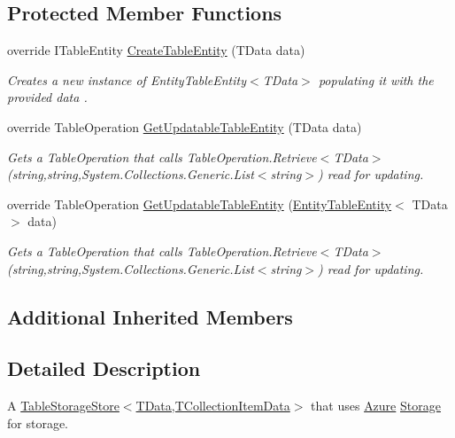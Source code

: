 \subsection*{Protected Member Functions}
\begin{DoxyCompactItemize}
\item 
override I\+Table\+Entity \hyperlink{classCqrs_1_1Azure_1_1BlobStorage_1_1DataStores_1_1TableStorageDataStore_ac28ce10858480acc61d3a3df4fb3dae4_ac28ce10858480acc61d3a3df4fb3dae4}{Create\+Table\+Entity} (T\+Data data)
\begin{DoxyCompactList}\small\item\em Creates a new instance of Entity\+Table\+Entity$<$\+T\+Data$>$ populating it with the provided {\itshape data} . \end{DoxyCompactList}\item 
override Table\+Operation \hyperlink{classCqrs_1_1Azure_1_1BlobStorage_1_1DataStores_1_1TableStorageDataStore_aa4dc1bfeeb55483b68d8af3414000f7a_aa4dc1bfeeb55483b68d8af3414000f7a}{Get\+Updatable\+Table\+Entity} (T\+Data data)
\begin{DoxyCompactList}\small\item\em Gets a Table\+Operation that calls Table\+Operation.\+Retrieve$<$\+T\+Data$>$(string,string,\+System.\+Collections.\+Generic.\+List$<$string$>$) read for updating. \end{DoxyCompactList}\item 
override Table\+Operation \hyperlink{classCqrs_1_1Azure_1_1BlobStorage_1_1DataStores_1_1TableStorageDataStore_a2a6af1eed637f7ac828078a883881fd3_a2a6af1eed637f7ac828078a883881fd3}{Get\+Updatable\+Table\+Entity} (\hyperlink{classCqrs_1_1Azure_1_1BlobStorage_1_1EntityTableEntity}{Entity\+Table\+Entity}$<$ T\+Data $>$ data)
\begin{DoxyCompactList}\small\item\em Gets a Table\+Operation that calls Table\+Operation.\+Retrieve$<$\+T\+Data$>$(string,string,\+System.\+Collections.\+Generic.\+List$<$string$>$) read for updating. \end{DoxyCompactList}\end{DoxyCompactItemize}
\subsection*{Additional Inherited Members}


\subsection{Detailed Description}
A \hyperlink{classCqrs_1_1Azure_1_1BlobStorage_1_1TableStorageStore_aabc36bc46ffb22b716cc7769a641cfab_aabc36bc46ffb22b716cc7769a641cfab}{Table\+Storage\+Store$<$\+T\+Data,\+T\+Collection\+Item\+Data$>$} that uses \hyperlink{namespaceCqrs_1_1Azure}{Azure} \hyperlink{namespaceCqrs_1_1Azure_1_1Storage}{Storage} for storage. 


